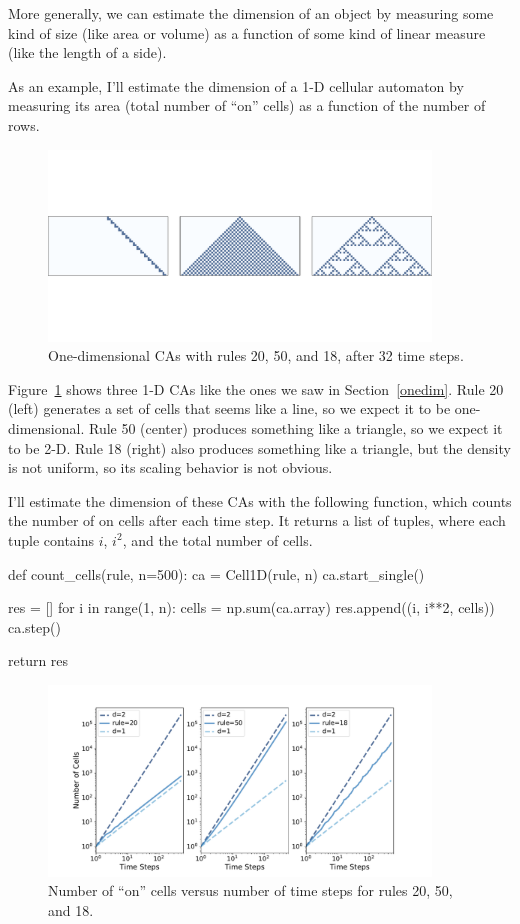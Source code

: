 \documentclass[12pt]{book}
\theoremstyle{exercise}
\begin{document}

More generally, we can estimate the dimension of an object by
measuring some kind of size (like area or volume) as a function of some kind of linear measure (like the length of a side).

As an example, I'll estimate the dimension of a 1-D cellular
automaton by measuring its area (total number of ``on'' cells)
as a function of the number of rows.


\begin{figure}
\centerline{\includegraphics[height=2in]{figs/chap07-7.pdf}}
\caption{One-dimensional CAs with rules 20, 50, and 18, after 32 time steps.}
\label{chap07-7}
\end{figure}

Figure~\ref{chap07-7} shows three 1-D CAs like the ones we saw
in Section~\ref{onedim}.  Rule 20 (left) generates
a set of cells that seems like a line, so we expect it to be one-dimensional.  Rule 50 (center) produces something like a triangle, so
we expect it to be 2-D.  Rule 18 (right) also produces something like a
triangle, but the density is not uniform, so its scaling behavior is
not obvious.


I'll estimate the dimension of these CAs with the following function,
which counts the number of on cells after each time step.
It returns a list of tuples, where each tuple contains $i$,
$i^2$, and the total number of cells.

\begin{code}
def count_cells(rule, n=500):
    ca = Cell1D(rule, n)
    ca.start_single()

    res = []
    for i in range(1, n):
        cells = np.sum(ca.array)
        res.append((i, i**2, cells))
        ca.step()

    return res
\end{code}

\begin{figure}
\centerline{\includegraphics[height=2in]{figs/chap07-8.pdf}}
\caption{Number of ``on'' cells versus number of time steps for
rules 20, 50, and 18.}
\label{chap07-8}
\end{figure}
\end{document}
